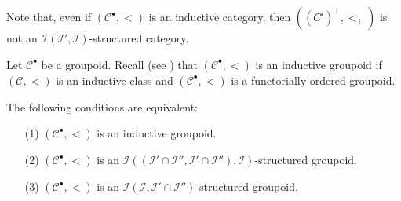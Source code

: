\documentclass[a4paper,fleqn]{article}
\theoremstyle{plain}
\newenvironment{theorem}[1]
  {\renewcommand\theinnertheorem{#1}\innertheorem}
  {\endinnertheorem}
\theoremstyle{definition}
\newcommand{\CC}{\mathcal{C}}
\newcommand{\II}{\mathcal{I}}
\newcommand{\smallbullet}{\bullet}
\begin{document}
Note that, even if $(\CC^\smallbullet,<)$ is an inductive category, then $((C^l)^\perp,<_\perp)$ is not an $\II(\II',\II)$-structured category.

Let $\CC^\smallbullet$ be a groupoid.
Recall (see \cite{3a}) that $(\CC^\smallbullet,<)$ is an inductive groupoid if $(\CC,<)$ is an inductive class and $(\CC^\smallbullet,<)$ is a functorially ordered groupoid.

\begin{theorem}{10}
\label{theorem:ii-10}
  The following conditions are equivalent:
  \begin{enumerate}
    \item[\normalfont(1)]
      $(\CC^\smallbullet,<)$ is an inductive groupoid.
    \item[\normalfont(2)]
      $(\CC^\smallbullet,<)$ is an $\II((\II'\cap\II'',\II'\cap\II''),\II)$-structured groupoid.
    \item[\normalfont(3)]
      $(\CC^\smallbullet,<)$ is an $\II(\II,\II'\cap\II'')$-structured groupoid.
  \end{enumerate}
\end{theorem}
\end{document}
